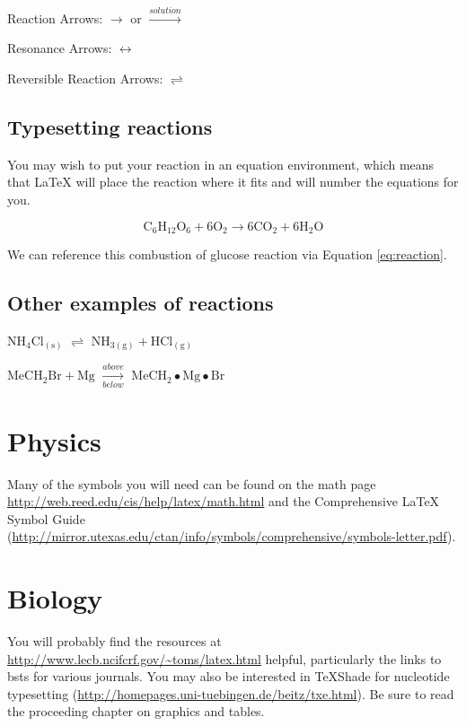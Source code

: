 \documentclass[12pt,twoside]{reedthesis}
\theoremstyle{definition}
\theoremstyle{definition}
\theoremstyle{remark}
\begin{document}
  \noindent Reaction Arrows: \(\longrightarrow\) or
  \(\xrightarrow{solution}\)
  
  \noindent Resonance Arrows: \(\leftrightarrow\)
  
  \noindent Reversible Reaction Arrows: \(\rightleftharpoons\)
  
  \subsection{Typesetting reactions}\label{typesetting-reactions}
  
  You may wish to put your reaction in an equation environment, which
  means that LaTeX will place the reaction where it fits and will number
  the equations for you.
  
  \begin{equation}
    \mathrm{C_6H_{12}O_6  + 6O_2} \longrightarrow \mathrm{6CO_2 + 6H_2O}
    \label{eq:reaction}
  \end{equation}
  
  We can reference this combustion of glucose reaction via Equation
  \eqref{eq:reaction}.
  
  \subsection{Other examples of
  reactions}\label{other-examples-of-reactions}
  
  \(\mathrm{NH_4Cl_{(s)}}\) \(\rightleftharpoons\)
  \(\mathrm{NH_{3(g)}+HCl_{(g)}}\)
  
  \noindent \(\mathrm{MeCH_2Br + Mg}\) \(\xrightarrow[below]{above}\)
  \(\mathrm{MeCH_2\bullet Mg \bullet Br}\)
  
  \section{Physics}\label{physics}
  
  Many of the symbols you will need can be found on the math page
  \url{http://web.reed.edu/cis/help/latex/math.html} and the Comprehensive
  LaTeX Symbol Guide
  (\url{http://mirror.utexas.edu/ctan/info/symbols/comprehensive/symbols-letter.pdf}).
  
  \section{Biology}\label{biology}
  
  You will probably find the resources at
  \url{http://www.lecb.ncifcrf.gov/~toms/latex.html} helpful, particularly
  the links to bsts for various journals. You may also be interested in
  TeXShade for nucleotide typesetting
  (\url{http://homepages.uni-tuebingen.de/beitz/txe.html}). Be sure to
  read the proceeding chapter on graphics and tables.
  
\end{document}

